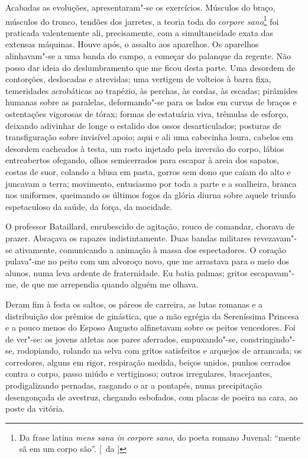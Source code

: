Acabadas as evoluções, apresentaram"-se os
exercícios. Músculos do braço, músculos do tronco, tendões dos
jarretes, a teoria toda do \textit{corpore sano}\footnote{ Da frase latina 
\textit{mens sana in corpore sano}, do poeta romano Juvenal: 
``mente sã em um corpo são''. [~da ]} foi praticada valentemente ali,
precisamente, com a simultaneidade exata das extensas máquinas. Houve
após, o assalto aos aparelhos. Os aparelhos alinhavam"-se a uma banda
do campo, a começar do palanque da regente. Não posso dar ideia do
deslumbramento que me ficou desta parte. Uma desordem de contorções,
deslocadas e atrevidas; uma vertigem de volteios à barra fixa,
temeridades acrobáticas ao trapézio, às perchas, às cordas, às escadas;
pirâmides humanas sobre as paralelas, deformando"-se para os lados em
curvas de braços e ostentações vigorosas de tórax; formas de estatuária
viva, trêmulas de esforço, deixando adivinhar de longe o estalido dos
ossos desarticulados; posturas de transfiguração sobre invisível apoio;
aqui e ali uma cabecinha loura, cabelos em desordem cacheados à testa,
um rosto injetado pela inversão do corpo, lábios entreabertos ofegando,
olhos semicerrados para escapar à areia dos sapatos, costas de suor,
colando a blusa em pasta, gorros sem dono que caíam do alto e juncavam
a terra; movimento, entusiasmo por toda a parte e a soalheira, branca
nos uniformes, queimando os últimos fogos da glória diurna sobre aquele
triunfo espetaculoso da saúde, da força, da mocidade. 

O professor Bataillard, enrubescido de agitação, rouco de comandar, chorava de
prazer. Abraçava os rapazes indistintamente. Duas bandas militares
revezavam"-se ativamente, comunicando a animação à massa dos
espectadores. O coração pulava"-me no peito com um alvoroço novo, que
me arrastava para o meio dos alunos, numa leva ardente de fraternidade.
Eu batia palmas; gritos escapavam"-me, de que me arrependia quando
alguém me olhava. 

Deram fim à festa os saltos, os páreos de carreira,
as lutas romanas e a distribuição dos prêmios de ginástica, que a mão
egrégia da Sereníssima Princesa e a pouco menos do Esposo Augusto
alfinetavam sobre os peitos vencedores. Foi de ver"-se: os jovens
atletas aos pares aferrados, empuxando"-se, constringindo"-se,
rodopiando, rolando na selva com gritos satisfeitos e arquejos de
arrancada; os corredores, alguns em rigor, respiração medida, beiços
unidos, punhos cerrados contra o corpo, passo miúdo e vertiginoso;
outros irregulares, bracejantes, prodigalizando pernadas, rasgando o ar
a pontapés, numa precipitação desengonçada de avestruz, chegando
esbofados, com placas de poeira na cara, ao poste da vitória. 

